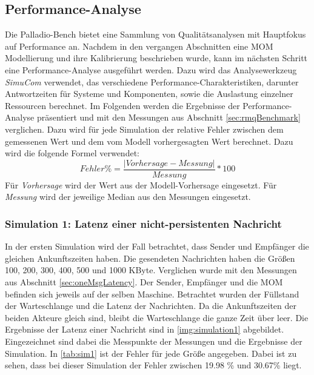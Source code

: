 \subsection{Performance-Analyse}
\label{sec:performanceanalyse}
Die Palladio-Bench bietet eine Sammlung von Qualitätsanalysen mit Hauptfokus auf Performance an. Nachdem in den vergangen Abschnitten eine MOM Modellierung und ihre Kalibrierung beschrieben wurde, kann im nächsten Schritt eine Performance-Analyse ausgeführt werden. Dazu wird das Analysewerkzeug \emph{SimuCom} verwendet, das verschiedene Performance-Charakteristiken, darunter Antwortzeiten für Systeme und Komponenten, sowie die Auslastung einzelner Ressourcen berechnet. Im Folgenden werden die Ergebnisse der Performance-Analyse präsentiert und mit den Messungen aus Abschnitt \ref{sec:rmqBenchmark} verglichen. Dazu wird für jede Simulation der relative Fehler zwischen dem gemessenen Wert und dem vom Modell vorhergesagten Wert berechnet. Dazu wird die folgende Formel verwendet: \[ Fehler\% = \frac{|Vorhersage - Messung|}{Messung} * 100 \] Für \textit{Vorhersage} wird der Wert aus der Modell-Vorhersage eingesetzt. Für \textit{Messung} wird der jeweilige Median aus den Messungen eingesetzt.

\subsubsection{Simulation 1: Latenz einer nicht-persistenten Nachricht}
\label{sec:rmqSimulation1}
In der ersten Simulation wird der Fall betrachtet, dass Sender und Empfänger die gleichen Ankunftszeiten haben. Die gesendeten Nachrichten haben die Größen 100, 200, 300, 400, 500 und 1000 KByte. Verglichen wurde mit den Messungen aus Abschnitt \ref{sec:oneMsgLatency}. Der Sender, Empfänger und die MOM befinden sich jeweils auf der selben Maschine. Betrachtet wurden der Füllstand der Warteschlange und die Latenz der Nachrichten. 
Da die Ankunftszeiten der beiden Akteure gleich sind, bleibt die Warteschlange die ganze Zeit über leer. Die Ergebnisse der Latenz einer Nachricht sind in \autoref{img:simulation1} abgebildet. Eingezeichnet sind dabei die Messpunkte der Messungen und die Ergebnisse der Simulation. In \autoref{tab:sim1} ist der Fehler für jede Größe angegeben. Dabei ist zu sehen, dass bei dieser Simulation der Fehler zwischen 19.98 \% und 30.67\% liegt.


